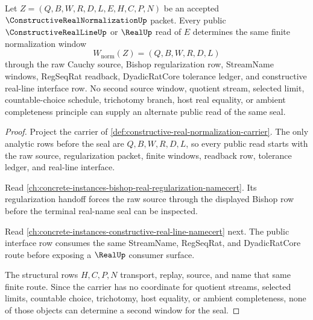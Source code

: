 \begin{theorem}
\label{thm:constructive-real-normalization-window}
Let $Z=(Q,B,W,R,D,L,E,H,C,P,N)$ be an accepted $\ConstructiveRealNormalizationUp$ packet. Every public $\ConstructiveRealLineUp$ or $\RealUp$ read of $E$ determines the same finite normalization window
$$
W_{\mathrm{norm}}(Z)=(Q,B,W,R,D,L)
$$
through the raw Cauchy source, Bishop regularization row, StreamName windows, RegSeqRat readback, DyadicRatCore tolerance ledger, and constructive real-line interface row. No second source window, quotient stream, selected limit, countable-choice schedule, trichotomy branch, host real equality, or ambient completeness principle can supply an alternate public read of the same seal.
\end{theorem}
\begin{proof}
Project the carrier of \autoref{def:constructive-real-normalization-carrier}. The only analytic rows before the seal are $Q,B,W,R,D,L$, so every public read starts with the raw source, regularization packet, finite windows, readback row, tolerance ledger, and real-line interface.

Read \autoref{ch:concrete-instances-bishop-real-regularization-namecert}. Its regularization handoff forces the raw source through the displayed Bishop row before the terminal real-name seal can be inspected.

Read \autoref{ch:concrete-instances-constructive-real-line-namecert} next. The public interface row consumes the same StreamName, RegSeqRat, and DyadicRatCore route before exposing a $\RealUp$ consumer surface.

The structural rows $H,C,P,N$ transport, replay, source, and name that same finite route. Since the carrier has no coordinate for quotient streams, selected limits, countable choice, trichotomy, host equality, or ambient completeness, none of those objects can determine a second window for the seal.
\end{proof}


